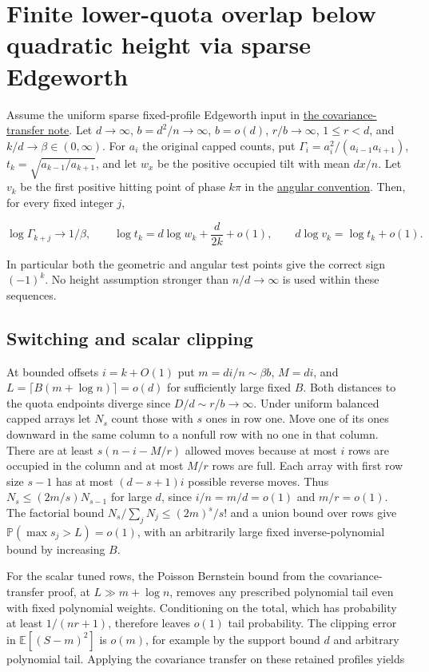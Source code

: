 \section{Finite lower-quota overlap below quadratic height via sparse Edgeworth}\label{sec:edgeworth-finite-lower-overlap}

Assume the uniform sparse fixed-profile Edgeworth input in \hyperref[sec:edgeworth-bounded-rank-ratio]{the covariance-transfer note}. Let $d\to\infty$, $b=d^2/n\to\infty$, $b=o(d)$, $r/b\to\infty$, $1\le r<d$, and $k/d\to\beta\in(0,\infty)$. For $a_i$ the original capped counts, put $\Gamma_i=a_i^2/(a_{i-1}a_{i+1})$, $t_k=\sqrt{a_{k-1}/a_{k+1}}$, and let $w_x$ be the positive occupied tilt with mean $dx/n$. Let $v_k$ be the first positive hitting point of phase $k\pi$ in the \hyperref[sec:analytic-angular-signs]{angular convention}. Then, for every fixed integer $j$,

\begin{equation*}
\log\Gamma_{k+j}\to1/\beta,\qquad
\log t_k=d\log w_k+\frac{d}{2k}+o(1),\qquad
d\log v_k=\log t_k+o(1).
\end{equation*}

In particular both the geometric and angular test points give the correct sign $(-1)^k$. No height assumption stronger than $n/d\to\infty$ is used within these sequences.

\subsection{Switching and scalar clipping}

At bounded offsets $i=k+O(1)$ put $m=di/n\sim\beta b$, $M=di$, and $L=\lceil B(m+\log n)\rceil=o(d)$ for sufficiently large fixed $B$. Both distances to the quota endpoints diverge since $D/d\sim r/b\to\infty$. Under uniform balanced capped arrays let $N_s$ count those with $s$ ones in row one. Move one of its ones downward in the same column to a nonfull row with no one in that column. There are at least $s(n-i-M/r)$ allowed moves because at most $i$ rows are occupied in the column and at most $M/r$ rows are full. Each array with first row size $s-1$ has at most $(d-s+1)i$ possible reverse moves. Thus $N_s\le(2m/s)N_{s-1}$ for large $d$, since $i/n=m/d=o(1)$ and $m/r=o(1)$. The factorial bound $N_s/\sum_jN_j\le(2m)^s/s!$ and a union bound over rows give $\mathbb P(\max s_j>L)=o(1)$, with an arbitrarily large fixed inverse-polynomial bound by increasing $B$.

For the scalar tuned rows, the Poisson Bernstein bound from the covariance-transfer proof, at $L\gg m+\log n$, removes any prescribed polynomial tail even with fixed polynomial weights. Conditioning on the total, which has probability at least $1/(nr+1)$, therefore leaves $o(1)$ tail probability. The clipping error in $\mathbb E[(S-m)^2]$ is $o(m)$, for example by the support bound $d$ and arbitrary polynomial tail. Applying the covariance transfer on these retained profiles yields

